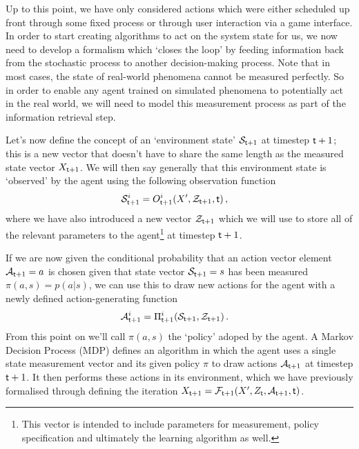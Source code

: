 Up to this point, we have only considered actions which were either scheduled up front through some fixed process or through user interaction via a game interface. In order to start creating algorithms to act on the system state for us, we now need to develop a formalism which `closes the loop' by feeding information back from the stochastic process to another decision-making process. Note that in most cases, the state of real-world phenomena cannot be measured perfectly. So in order to enable any agent trained on simulated phenomena to potentially act in the real world, we will need to model this measurement process as part of the information retrieval step.

Let's now define the concept of an `environment state' ${\cal S}_{{\sf t}+1}$ at timestep ${\sf t}+1$; this is a new vector that doesn't have to share the same length as the measured state vector $X_{{\sf t}+1}$. We will then say generally that this environment state is `observed' by the agent using the following observation function
\begin{align}
{\cal S}_{{\sf t}+1}^i &= O_{{\sf t}+1}^i(X',{\cal Z}_{{\sf t}+1},{\sf t}) \label{eq:generalised-state-measurement} \,,
\end{align}
where we have also introduced a new vector ${\cal Z}_{{\sf t}+1}$ which we will use to store all of the relevant parameters to the agent\footnote{This vector is intended to include parameters for measurement, policy specification and ultimately the learning algorithm as well.} at timestep ${\sf t}+1$.

If we are now given the conditional probability that an action vector element ${\cal A}_{{\sf t}+1}=a$ is chosen given that state vector ${\cal S}_{{\sf t}+1}=s$ has been measured $\pi (a,s) = p(a\vert s)$, we can use this to draw new actions for the agent with a newly defined action-generating function
\begin{align}
{\cal A}_{{\sf t}+1}^i &= \Pi_{{\sf t}+1}^i({\cal S}_{{\sf t}+1}, {\cal Z}_{{\sf t}+1}) \label{eq:action-generating-function} \,.
\end{align}
From this point on we'll call $\pi (a,s)$ the `policy' adoped by the agent. A Markov Decision Process (MDP) defines an algorithm in which the agent uses a single state measurement vector and its given policy $\pi$ to draw actions ${\cal A}_{{\sf t}+1}$ at timestep ${{\sf t}+1}$. It then performs these actions in its environment, which we have previously formalised through defining the iteration $X_{{\sf t}+1} = {\cal F}_{{\sf t}+1}(X',Z_{\sf t},{\cal A}_{{\sf t}+1},{\sf t})$. 